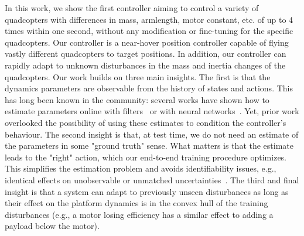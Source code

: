 %
% 
In this work, we show the first controller aiming to control a variety of quadcopters with differences in mass, armlength, motor constant, etc. of up to 4 times within one second, without any modification or fine-tuning for the specific quadcopters. Our controller is a near-hover position controller capable of flying vastly different quadcopters to target positions.
%
In addition, our controller can rapidly adapt to unknown disturbances in the mass and inertia changes of the quadcopters.
%
Our work builds on three main insights.
%
The first is that the dynamics parameters are observable from the history of states and actions.
%
This has long been known in the community: several works have shown how to estimate parameters online with filters~\cite{svacha2020imu,wuest2019online} or with neural networks~\cite{forgione2021continuous}.
%
Yet, prior work overlooked the possibility of using these estimates to condition the controller's behaviour.
%
The second insight is that, at test time, we do not need an estimate of the parameters in some "ground truth" sense.
%
What matters is that the estimate leads to the "right" action, which our end-to-end training procedure optimizes.
%
This simplifies the estimation problem and avoids identifiability issues, e.g., identical effects on unobservable or unmatched uncertainties~\cite{hovakimyan2010l1}.
%
%
%
The third and final insight is that a system can adapt to previously unseen disturbances as long as their effect on the platform dynamics is in the convex hull of the training disturbances (e.g., a motor losing efficiency has a similar effect to adding a payload below the motor).

